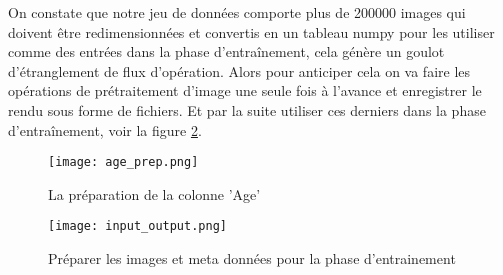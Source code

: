 On constate que notre jeu de données comporte plus de 200000 images qui doivent être redimensionnées et convertis en un tableau numpy pour les utiliser comme des entrées dans la phase d'entraînement, cela génère un goulot d’étranglement de flux d’opération. Alors pour anticiper cela on va faire les opérations de prétraitement d’image une seule fois à l'avance et enregistrer le rendu sous forme de fichiers. Et par la suite utiliser ces derniers dans la phase d'entraînement, voir la figure \ref{fig:input_output}.

\begin{figure}[H]
    \centering
    \texttt{[image: age\_prep.png]}
    \caption{La préparation de la colonne ’Age’}\label{fig:age_prep}
\end{figure}




\begin{figure}[H]
    \centering
    \texttt{[image: input\_output.png]}
    \caption{Préparer les images et meta données pour la phase d’entrainement}\label{fig:input_output}
\end{figure}


